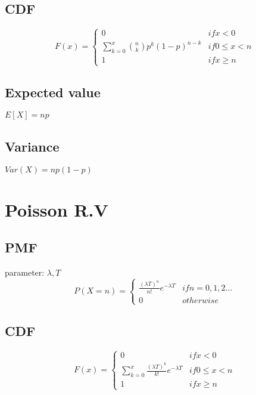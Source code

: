     \subsection*{CDF}
        \begin{equation*}
            F(x)=
            \begin{cases}
                0 & if x < 0 \\
                \sum_{k=0}^{x} \binom{n}{k} p^k (1-p)^{n-k} & if 0 \leq x < n \\
                1 & if x \geq n
            \end{cases}
        \end{equation*}

    \subsection*{Expected value}
        $E[X] = np$

    \subsection*{Variance}
        $Var(X)=np(1-p)$

\section{Poisson R.V}
    \subsection*{PMF}
        parameter: $\lambda, T$
        \begin{equation*}
            P(X=n)=
            \begin{cases}
                \frac{(\lambda T)^n}{n!} e^{-\lambda T} & if n = 0,1,2... \\
                0 & otherwise
            \end{cases}
        \end{equation*}

    \subsection*{CDF}
        \begin{equation*}
            F(x)=
            \begin{cases}
                0 & if x < 0 \\
                \sum_{k=0}^{x} \frac{(\lambda T)^k}{k!} e^{-\lambda T} & if 0 \leq x < n \\
                1 & if x \geq n
            \end{cases}
        \end{equation*}


